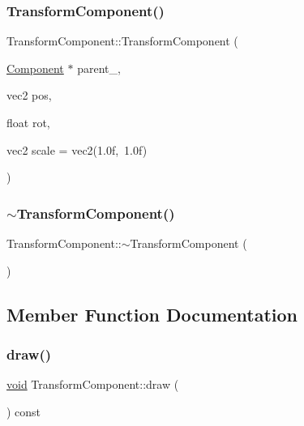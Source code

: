 \subsubsection{\texorpdfstring{Transform\+Component()}{TransformComponent()}\hspace{0.1cm}{\footnotesize\ttfamily [2/2]}}
{\footnotesize\ttfamily Transform\+Component\+::\+Transform\+Component (\begin{DoxyParamCaption}\item[{\hyperlink{classComponent}{Component} $\ast$}]{parent\+\_\+,  }\item[{vec2}]{pos,  }\item[{float}]{rot,  }\item[{vec2}]{scale = {\ttfamily vec2(1.0f,~1.0f)} }\end{DoxyParamCaption})}

\mbox{\label{classTransformComponent_a37d5d34a3695eafc8b8cbf37905e756f}} 
\subsubsection{\texorpdfstring{$\sim$\+Transform\+Component()}{~TransformComponent()}}
{\footnotesize\ttfamily Transform\+Component\+::$\sim$\+Transform\+Component (\begin{DoxyParamCaption}{ }\end{DoxyParamCaption})}



\subsection{Member Function Documentation}
\mbox{\label{classTransformComponent_a5447f13e20359c750f165332015af3ea}} 
\subsubsection{\texorpdfstring{draw()}{draw()}}
{\footnotesize\ttfamily \hyperlink{imgui__impl__opengl3__loader_8h_ac668e7cffd9e2e9cfee428b9b2f34fa7}{void} Transform\+Component\+::draw (\begin{DoxyParamCaption}{ }\end{DoxyParamCaption}) const\hspace{0.3cm}{\ttfamily [virtual]}}



